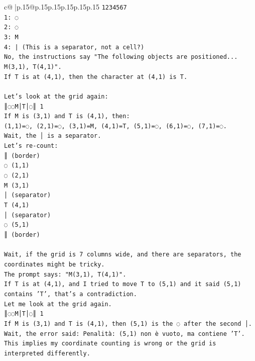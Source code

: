 \documentclass{article}
\begin{document}
{\begin{supertabular}{c@{$\;$}|p{.15\linewidth}@{}p{.15\linewidth}p{.15\linewidth}p{.15\linewidth}p{.15\linewidth}p{.15\linewidth}}
{{{\texttt{1234567} \\
\texttt{1: ◌} \\
\texttt{2: ◌} \\
\texttt{3: M} \\
\texttt{4: | (This is a separator, not a cell?)} \\
\texttt{No, the instructions say "The following objects are positioned... M(3,1), T(4,1)".} \\
\texttt{If T is at (4,1), then the character at (4,1) is T.} \\
\\ 
\texttt{Let's look at the grid again:} \\
\texttt{║◌◌M│T│◌║ 1} \\
\texttt{If M is (3,1) and T is (4,1), then:} \\
\texttt{(1,1)=◌, (2,1)=◌, (3,1)=M, (4,1)=T, (5,1)=◌, (6,1)=◌, (7,1)=◌.} \\
\texttt{Wait, the │ is a separator.} \\
\texttt{Let's re{-}count:} \\
\texttt{║ (border)} \\
\texttt{◌ (1,1)} \\
\texttt{◌ (2,1)} \\
\texttt{M (3,1)} \\
\texttt{│ (separator)} \\
\texttt{T (4,1)} \\
\texttt{│ (separator)} \\
\texttt{◌ (5,1)} \\
\texttt{║ (border)} \\
\\ 
\texttt{Wait, if the grid is 7 columns wide, and there are separators, the coordinates might be tricky.} \\
\texttt{The prompt says: "M(3,1), T(4,1)".} \\
\texttt{If T is at (4,1), and I tried to move T to (5,1) and it said (5,1) contains 'T', that's a contradiction.} \\
\texttt{Let me look at the grid again.} \\
\texttt{║◌◌M│T│◌║ 1} \\
\texttt{If M is (3,1) and T is (4,1), then (5,1) is the ◌ after the second │.} \\
\texttt{Wait, the error said: Penalità: (5,1) non è vuoto, ma contiene 'T'.} \\
\texttt{This implies my coordinate counting is wrong or the grid is interpreted differently.} \\
}}}
\end{supertabular}}
\end{document}
